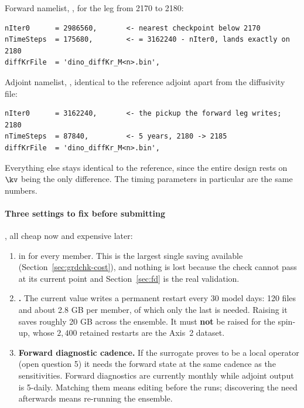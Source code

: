 Forward namelist, , for the
leg from 2170 to 2180:

\begin{footnotesize}
\begin{verbatim}
nIter0      = 2986560,       <- nearest checkpoint below 2170
nTimeSteps  = 175680,        <- = 3162240 - nIter0, lands exactly on 2180
diffKrFile  = 'dino_diffKr_M<n>.bin',
\end{verbatim}
\end{footnotesize}

Adjoint namelist, ,
identical to the reference adjoint apart from the diffusivity file:

\begin{footnotesize}
\begin{verbatim}
nIter0      = 3162240,       <- the pickup the forward leg writes; 2180
nTimeSteps  = 87840,         <- 5 years, 2180 -> 2185
diffKrFile  = 'dino_diffKr_M<n>.bin',
\end{verbatim}
\end{footnotesize}

Everything else stays identical to the reference, since the entire design rests
on $\kv$ being the only difference. The timing parameters in particular are the
same numbers.

\paragraph{Three settings to fix before submitting}, all cheap now and expensive
later:

\begin{enumerate}
  \item \textbf{} in  for every member.
        This is the largest single saving available
        (Section~\ref{sec:grdchk-cost}), and nothing is lost because the check
        cannot pass at its current point and Section~\ref{sec:fd} is the real
        validation.
  \item \textbf{.} The current value writes a permanent restart
        every 30 model days: 120 files and about 2.8 GB per member, of which only
        the last is needed. Raising it saves roughly 20 GB across the ensemble.
        It must \textbf{not} be raised for the spin-up, whose $2{,}400$ retained
        restarts are the Axis~2 dataset.
  \item \textbf{Forward diagnostic cadence.} If the surrogate proves to be a
        local operator (open question 5) it needs the forward state at the same
        cadence as the sensitivities. Forward diagnostics are currently monthly
        while adjoint output is 5-daily. Matching them means editing
         before the runs; discovering the need afterwards
        means re-running the ensemble.
\end{enumerate}

